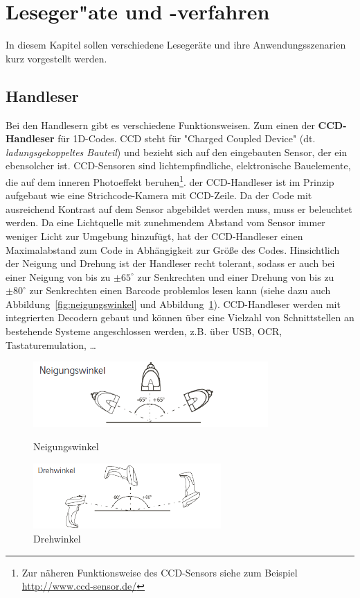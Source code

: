 \section{Leseger"ate und -verfahren}
In diesem Kapitel sollen verschiedene Lesegeräte und ihre Anwendungsszenarien kurz vorgestellt werden.

\subsection{Handleser}
Bei den Handlesern gibt es verschiedene Funktionsweisen. Zum einen der \textbf{CCD-Handleser} für 1D-Codes. CCD steht für "Charged Coupled Device" (dt. \textit{ladungsgekoppeltes Bauteil}) und bezieht sich auf den eingebauten Sensor, der ein ebensolcher ist. CCD-Sensoren sind lichtempfindliche, elektronische Bauelemente, die auf dem inneren Photoeffekt beruhen\footnote{Zur näheren Funktionsweise des CCD-Sensors siehe zum Beispiel \url{http://www.ccd-sensor.de/}}. der CCD-Handleser ist im Prinzip aufgebaut wie eine Strichcode-Kamera mit CCD-Zeile. Da der Code mit ausreichend Kontrast auf dem Sensor abgebildet werden muss, muss er beleuchtet werden. Da eine Lichtquelle mit zunehmendem Abstand vom Sensor immer weniger Licht zur Umgebung hinzufügt, hat der CCD-Handleser einen Maximalabstand zum Code in Abhängigkeit zur Größe des Codes. Hinsichtlich der Neigung und Drehung ist der Handleser recht tolerant, sodass er auch bei einer Neigung von bis zu $\pm65^\circ$ zur Senkrechten und einer Drehung von bis zu $\pm80^\circ$ zur Senkrechten einen Barcode problemlos lesen kann (siehe dazu auch Abbildung~\ref{fig:neigungswinkel} und Abbildung~\ref{fig:drehwinkel}). CCD-Handleser werden mit integrierten Decodern gebaut und können über eine Vielzahl von Schnittstellen an bestehende Systeme angeschlossen werden, z.B. über USB, OCR, Tastaturemulation, \dots \\

\begin{figure}[htbp]
	\parbox{.47\textwidth}{\centering
		\includegraphics[height=2.5cm]{Bilder/Neigungswinkel.png}
		\caption{Neigungswinkel}
		\label{fig:neigungswinkel}}
	\hfill
	\parbox{.47\textwidth}{\centering
		\includegraphics[height=2.5cm]{Bilder/Drehwinkel.png}
		\caption{Drehwinkel}
		\label{fig:drehwinkel}}
	\hfill
\end{figure}

